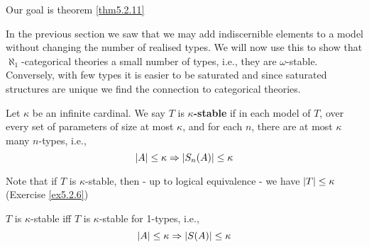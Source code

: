 \documentclass[11pt]{article}
\begin{document}
Our goal is theorem \ref{thm5.2.11}
\begin{center}\end{center}


In the previous section we saw that we may add indiscernible elements to a model without
changing the number of realised types. We will now use this to show that \(\aleph_1\)-categorical
theories a small number of types, i.e., they are \(\omega\)-stable. Conversely, with few types it is
easier to be saturated and since saturated structures are unique we find the connection to
categorical theories.

\begin{definition}[]
Let \(\kappa\) be an infinite cardinal. We say \(T\) is \textbf{\(\kappa\)-stable} if in each model of \(T\), over
every set of parameters of size at most \(\kappa\), and for each \(n\), there are at most \(\kappa\)
many \(n\)-types, i.e.,
\begin{equation*}
\abs{A}\le\kappa\Rightarrow\abs{S_n(A)}\le\kappa
\end{equation*}
\end{definition}

Note that if \(T\) is \(\kappa\)-stable, then - up to logical equivalence - we have \(\abs{T}\le\kappa\)
(Exercise \ref{ex5.2.6})

\begin{lemma}[]
\label{lemma5.2.2}
\(T\) is \(\kappa\)-stable iff \(T\) is \(\kappa\)-stable for 1-types, i.e.,
\begin{equation*}
 \abs{A}\le\kappa\Rightarrow\abs{S(A)}\le\kappa
\end{equation*}
\end{lemma}
\end{document}
